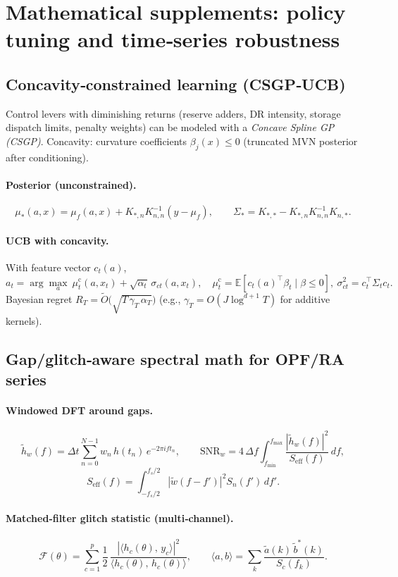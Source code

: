 \documentclass[11pt]{article}
\numberwithin{equation}{section}
\theoremstyle{definition}
\theoremstyle{remark}
\begin{document}
\section{Mathematical supplements: policy tuning and time‑series robustness}
\label{sec:math-supp}

\subsection{Concavity‑constrained learning (CSGP‑UCB)}
Control levers with diminishing returns (reserve adders, DR intensity, storage dispatch limits, penalty weights) can be modeled with a \emph{Concave Spline GP (CSGP)}. Concavity: curvature coefficients \(\beta_j(x)\le 0\) (truncated MVN posterior after conditioning).

\paragraph{Posterior (unconstrained).}
\[
\mu_*(a,x)=\mu_f(a,x)+K_{*,n}K_{n,n}^{-1}\!\left(y-\mu_f\right),\qquad
\Sigma_* = K_{*,*}-K_{*,n}K_{n,n}^{-1}K_{n,*}.
\]

\paragraph{UCB with concavity.}
With feature vector \(c_t(a)\),
\[
a_t=\arg\max_a \ \mu_t^{\mathrm{c}}(a,x_t)+\sqrt{\alpha_t}\,\sigma_{ct}(a,x_t),
\quad
\mu_t^{\mathrm{c}}=\mathbb{E}[c_t(a)^\top\beta_t\mid\beta\le 0],\ 
\sigma_{ct}^2=c_t^\top\Sigma_t c_t.
\]
Bayesian regret \(R_T=\tilde O\!\big(\sqrt{T\,\gamma_T\,\alpha_T}\big)\) (e.g., \(\gamma_T=O(J\log^{d+1}\!T)\) for additive kernels).

\subsection{Gap/glitch‑aware spectral math for OPF/RA series}
\paragraph{Windowed DFT around gaps.}
\[
\tilde h_w(f)=\Delta t\sum_{n=0}^{N-1} w_n\,h(t_n)\,e^{-2\pi i f t_n},
\qquad
\mathrm{SNR}_w = 4\,\Delta f\!\int_{f_{\min}}^{f_{\max}}\!
\frac{|\tilde h_w(f)|^2}{S_{\mathrm{eff}}(f)}\,df,
\]
\[
S_{\mathrm{eff}}(f)=\!\int_{-f_s/2}^{f_s/2}\!|\tilde w(f-f')|^2 S_n(f')\,df'.
\]

\paragraph{Matched‑filter glitch statistic (multi‑channel).}
\[
\mathcal F(\theta)=\sum_{c=1}^{p}\frac{1}{2}\,
\frac{|\langle h_c(\theta),\,y_c\rangle|^2}{\langle h_c(\theta),\,h_c(\theta)\rangle},
\qquad
\langle a,b\rangle=\sum_k \frac{\tilde a(k)\,\tilde b^*(k)}{S_c(f_k)}.
\]
\end{document}
